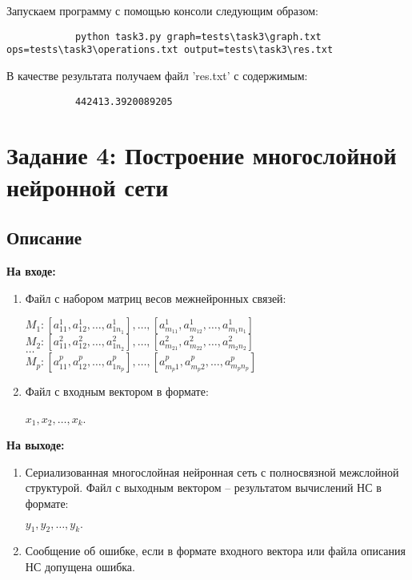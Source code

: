 \documentclass[bachelor, och, report]{../shiza}
\begin{document}
        Запускаем программу с помощью консоли следующим образом:

        \begin{verbatim}
            python task3.py graph=tests\task3\graph.txt ops=tests\task3\operations.txt output=tests\task3\res.txt
        \end{verbatim}

        В качестве результата получаем файл 'res.txt' с содержимым:

        \begin{verbatim}
            442413.3920089205
        \end{verbatim}

\section{Задание 4: Построение многослойной нейронной сети}
    \subsection{Описание}

        \textbf{На входе:}
            \begin{enumerate}
                \item Файл с набором матриц весов межнейронных связей:
                \begin{center}
                    $M_1 : [a_{11}^1, a_{12}^1, \dots, a_{1n_1}^1], \dots, [a_{m_11}^1, a_{m_12}^1, \dots ,a_{m_1n_1}^1]$ \\
                    $M_2 : [a_{11}^2, a_{12}^2, \dots, a_{1n_2}^2], \dots, [a_{m_21}^2, a_{m_22}^2, \dots ,a_{m_2n_2}^2]$\\
                    $\dots$\\
                    $M_p : [a_{11}^p, a_{12}^p, \dots, a_{1n_p}^p], \dots, [a_{m_p1}^p, a_{m_p2}^p, \dots,a_{m_pn_p}^p]$ \\                  
                \end{center}
                \item Файл с входным вектором в формате:
                \begin{center}
                    $x_1, x_2, \dots, x_k$.
                \end{center}
            \end{enumerate}

        \textbf{На выходе:}
            \begin{enumerate}
                \item Сериализованная многослойная нейронная сеть с полносвязной
                межслойной структурой. Файл с выходным вектором -- результатом
                вычислений НС в формате: 
                \begin{center}
                    $y_1, y_2, \dots, y_k.$                
                \end{center}
                \item Сообщение об ошибке, если в формате входного вектора или
                файла описания НС допущена ошибка.
            \end{enumerate}
\end{document}
